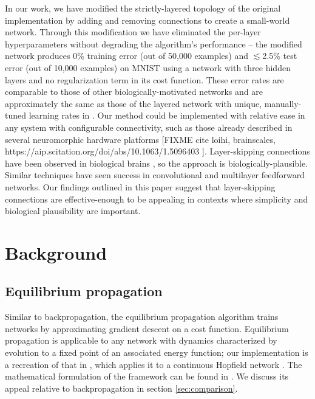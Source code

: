\documentclass[utf8]{frontiersSCNS}
\begin{document}
In our work, we have modified the strictly-layered topology of the original implementation by adding and removing connections to create a small-world network\citep{watts98}. Through this modification we have eliminated the per-layer hyperparameters without degrading the algorithm's performance -- the modified network produces 0\% training error (out of 50,000 examples) and $\lesssim$2.5\% test error (out of 10,000 examples) on MNIST using a network with three hidden layers and no regularization term in its cost function. These error rates are comparable to those of other biologically-motivated networks \citep{bartunov2018} and are approximately the same as those of the layered network with unique, manually-tuned learning rates in \citep{scellier17}. Our method could be implemented with relative ease in any system with configurable connectivity, such as those already described in several neuromorphic hardware platforms [FIXME cite loihi, brainscales, https://aip.scitation.org/doi/abs/10.1063/1.5096403 ]. Layer-skipping connections have been observed in biological brains \citep{bullmore2009}, so the approach is biologically-plausible. Similar techniques have seen success in convolutional \citep{he2015, srivastava2015} and multilayer feedforward \citep{xiaohu2011, krishnan2019} networks. Our findings outlined in this paper suggest that layer-skipping connections are effective-enough to be appealing in contexts where simplicity and biological plausibility are important.

\section{Background}

\subsection{Equilibrium propagation}
\label{sec:eqp_formulation}

Similar to backpropagation, the equilibrium propagation algorithm \citep{scellier17} trains networks by approximating gradient descent on a cost function. Equilibrium propagation is applicable to any network with dynamics characterized by evolution to a fixed point of an associated energy function; our implementation is a recreation of that in \citep{scellier17}, which applies it to a continuous Hopfield network \citep{hopfield1984}. The mathematical formulation of the framework can be found in \citep{scellier17}. We discuss its appeal relative to backpropagation in section \ref{sec:comparison}.
\end{document}
